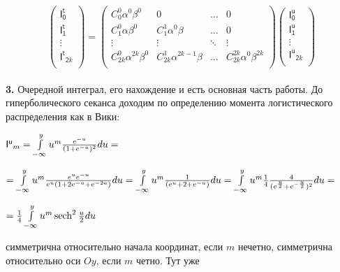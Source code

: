 \documentclass[a4paper,12pt]{article}
\begin{document}
\begin{displaymath}
    \begin{pmatrix}
        \mathsf{I^t_0} \\ \mathsf{I^t_1} \\ \vdots \\ \mathsf{I^t}_{\mathsf{2}k} \\
    \end{pmatrix} = \begin{pmatrix}
        C_0^0 \alpha^0 \beta^0 & 0 & \ldots & 0 \\
        C_1^0 \alpha \beta^{0} & C_1^1 \alpha^{0} \beta & \ldots & 0 \\
        \vdots & \vdots & \ddots & \vdots\\
        C_{2k}^0 \alpha^{2k} \beta^0 & C_{2k}^1 \alpha^{2k - 1} \beta & \ldots & C_{2k}^{2k} \alpha^{0} \beta^{2k} \\
    \end{pmatrix} \begin{pmatrix}
        \mathsf{I^u_0} \\ \mathsf{I^u_1} \\ \vdots \\ \mathsf{I^u}_{\mathsf{2}k} \\
    \end{pmatrix}
\end{displaymath}\\

\noindent\textbf{3.} Очередной интеграл, его нахождение и есть основная часть работы. До гиперболического секанса доходим по определению момента логистического распределения как в Вики:

\begin{center}
    $\mathsf{I^u}_m = \int\limits_{-\infty}^y u^m {e^{-u}\over{(1 + e^{-u}})^2} d u =$
\end{center}

\begin{center}
    $= \int\limits_{-\infty}^y u^m {e^{u}e^{-u}\over{e^{u}(1 + 2e^{-u}} + e^{-2u})} d u = \int\limits_{-\infty}^y u^m {1\over{(e^{u} + 2 + e^{-u})}} d u = \int\limits_{-\infty}^y u^m {1\over{4}} {4\over{(e^{u\over{2}} + e^{-{u\over{2}}})^2}} d u =$
\end{center}

\begin{center}
    $= {1\over{4}}\int\limits_{-\infty}^y u^m \operatorname{sech}^2{u\over{2}} d u$
\end{center}

 симметрична относительно начала координат, если $m$ нечетно, симметрична относительно оси $O y$, если $m$ четно. Тут уже  
\end{document}
